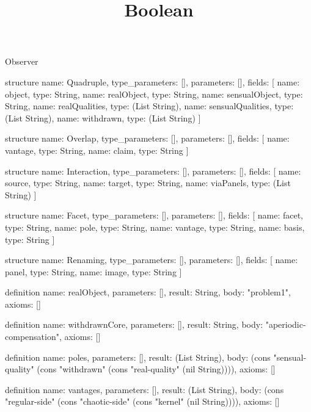\begin{lexlean}{Observer}
\title{Boolean}
\begin{semanticmodule}
structure{
  name: Quadruple,
  type_parameters: [],
  parameters: [],
  fields: [
    {name: object, type: String},
    {name: realObject, type: String},
    {name: sensualObject, type: String},
    {name: realQualities, type: (List String)},
    {name: sensualQualities, type: (List String)},
    {name: withdrawn, type: (List String)}
  ]
}

structure{
  name: Overlap,
  type_parameters: [],
  parameters: [],
  fields: [
    {name: vantage, type: String},
    {name: claim, type: String}
  ]
}

structure{
  name: Interaction,
  type_parameters: [],
  parameters: [],
  fields: [
    {name: source, type: String},
    {name: target, type: String},
    {name: viaPanels, type: (List String)}
  ]
}

structure{
  name: Facet,
  type_parameters: [],
  parameters: [],
  fields: [
    {name: facet, type: String},
    {name: pole, type: String},
    {name: vantage, type: String},
    {name: basis, type: String}
  ]
}

structure{
  name: Renaming,
  type_parameters: [],
  parameters: [],
  fields: [
    {name: panel, type: String},
    {name: image, type: String}
  ]
}

definition{
  name: realObject,
  parameters: [],
  result: String,
  body: "problem1",
  axioms: []
}

definition{
  name: withdrawnCore,
  parameters: [],
  result: String,
  body: "aperiodic-compensation",
  axioms: []
}

definition{
  name: poles,
  parameters: [],
  result: (List String),
  body: (cons "sensual-quality" (cons "withdrawn" (cons "real-quality" (nil String)))),
  axioms: []
}

definition{
  name: vantages,
  parameters: [],
  result: (List String),
  body: (cons "regular-side" (cons "chaotic-side" (cons "kernel" (nil String)))),
  axioms: []
}


\end{semanticmodule}
\end{lexlean}
